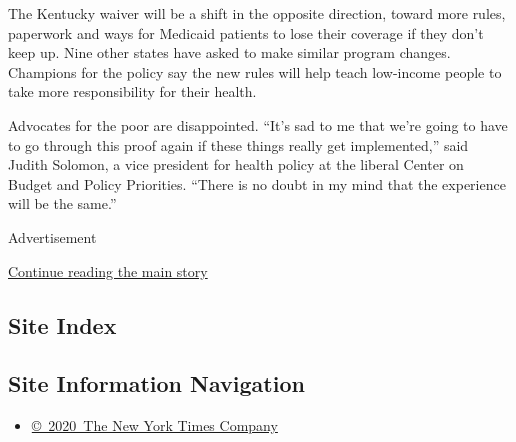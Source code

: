 The Kentucky waiver will be a shift in the opposite direction, toward
more rules, paperwork and ways for Medicaid patients to lose their
coverage if they don't keep up. Nine other states have asked to make
similar program changes. Champions for the policy say the new rules will
help teach low-income people to take more responsibility for their
health.

Advocates for the poor are disappointed. ``It's sad to me that we're
going to have to go through this proof again if these things really get
implemented,'' said Judith Solomon, a vice president for health policy
at the liberal Center on Budget and Policy Priorities. ``There is no
doubt in my mind that the experience will be the same.''

Advertisement

\protect\hyperlink{after-bottom}{Continue reading the main story}

\hypertarget{site-index}{%
\subsection{Site Index}\label{site-index}}

\hypertarget{site-information-navigation}{%
\subsection{Site Information
Navigation}\label{site-information-navigation}}

\begin{itemize}
\tightlist
\item
  \href{https://help.nytimes3xbfgragh.onion/hc/en-us/articles/115014792127-Copyright-notice}{©~2020~The
  New York Times Company}
\end{itemize}

